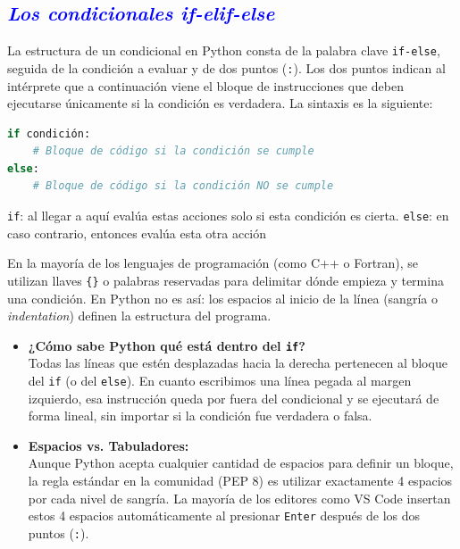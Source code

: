 \documentclass[12pt]{article}
\begin{document}
\subsection*{\textcolor{blue}{\textit{Los condicionales if-elif-else}}}

La estructura de un condicional en Python consta de la palabra clave \lstinline|if-else|, 
seguida de la condición a evaluar y de dos puntos (\lstinline|:|). 
Los dos puntos indican al intérprete que a continuación viene el bloque de
instrucciones que deben ejecutarse únicamente si la condición es verdadera.
La sintaxis es la siguiente:
\begin{lstlisting}[language=Python]
if condición:
    # Bloque de código si la condición se cumple
else:
    # Bloque de código si la condición NO se cumple
\end{lstlisting}
\lstinline|if|: \guillemotleft al llegar a aquí evalúa estas acciones solo si esta condición 
es cierta\guillemotright. \lstinline|else|: \guillemotleft en caso contrario, entonces evalúa 
esta otra acción  \guillemotright 

En la mayoría de los lenguajes de programación (como C++ o Fortran), 
se utilizan llaves \lstinline|{}| o palabras reservadas para delimitar dónde empieza y 
termina una condición. En Python no es así: los espacios al inicio de la línea
(sangría o \textit{indentation}) definen la estructura del programa.

\begin{itemize}
    \item \textbf{¿Cómo sabe Python qué está dentro del \texttt{if}?}\\
    Todas las líneas que estén desplazadas hacia la derecha pertenecen al
    bloque del \lstinline|if| (o del \lstinline|else|). En cuanto escribimos una línea
    pegada al margen izquierdo, esa instrucción queda por fuera del condicional y se 
    ejecutará de forma lineal, sin importar si la condición fue verdadera o falsa.
    
    \item \textbf{Espacios vs. Tabuladores:}\\
    Aunque Python acepta cualquier cantidad de espacios para definir un bloque, 
    la regla estándar en la comunidad (PEP 8) es utilizar exactamente 4 espacios
    por cada nivel de sangría. La mayoría de los editores como VS Code insertan estos 
    4 espacios automáticamente al presionar \texttt{Enter} después de los dos puntos 
    (\lstinline|:|).
\end{itemize}
\end{document}
